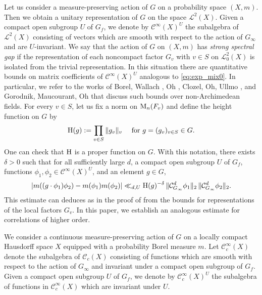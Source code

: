 \documentclass[11pt,reqno,a4paper]{amsart}
\numberwithin{equation}{section}
\newcommand{\cC}{\mathcal{C}}
\newcommand{\cL}{\mathcal{L}}
\theoremstyle{theorem}
\theoremstyle{definition}
\begin{document}
Let us consider a measure-preserving action of $G$ on a probability space $(X,m)$.
Then we obtain a unitary representation of $G$ on the space $\cL^2(X)$.
Given a compact open subgroup $U$ of $G_f$, we denote by $\cC^\infty(X)^U$
the subalgebra of $\cL^2(X)$ consisting of vectors which are smooth with respect to
the action of $G_\infty$ and are $U$-invariant.
We say that the action of $G$ on $(X,m)$
has \emph{strong spectral gap} if the representation of each noncompact factor $G_v$ with $v\in S$
on $\cL^2_{0}(X)$ is isolated  from the trivial representation.
In this situation there are quantitative bounds on matrix coefficients of $\cC^\infty(X)^U$
analogous to \eqref{eq:exp_mix0}. In particular, we refer to the works 
of Borel, Wallach \cite{BW}, Oh \cite{oh2}, Clozel, Oh, Ullmo \cite{CUO},
and Gorodnik, Maucourant, Oh \cite{GMO}
that discuss such bounds over non-Archimedean fields.
For every $v\in S$, let us fix a norm on $\hbox{M}_n(F_v)$ and define the height function on $G$ by
$$
\hbox{H}(g):=\prod_{v\in S} \|g_v\|_v\quad \hbox{ for $g=(g_v)_{v\in S}\in G$.} 
$$
One can check that $\hbox{H}$ is a proper function on $G$.
With this notation, there exists $\delta>0$
such that for all sufficiently large $d$, a compact open subgroup $U$ of $G_f$, 
functions $\phi_1,\phi_2\in \cC^\infty(X)^U$, and an element $g\in G$,
\begin{equation}
\label{eq:mixH}
|m((g\cdot \phi_1)\phi_2) -m(\phi_1)m(\phi_2)|\ll_{d,U} \hbox{H}(g)^{-\delta}\, \|\mathcal{C}_{G_\infty}^d\phi_1\|_2\, \|\mathcal{C}_{G_\infty}^d\phi_2\|_2.
\end{equation}
This estimate can deduces as in the proof of \cite[Theorem~3.27]{GMO} from the bounds 
for representations of the local factors $G_v$. In this paper, we establish an analogous estimate for correlations
of higher order.

We consider a continuous measure-preserving action of $G$ on a locally compact Hausdorff space $X$
equipped with a probability Borel measure $m$. Let $\cC_c^\infty(X)$ 
denote the subalgebra of $\cC_c(X)$ consisting of functions which are smooth with
respect to the action of $G_\infty$ and invariant under a compact open subgroup of $G_f$.
Given a compact open subgroup $U$ of $G_f$, we denote by $\cC_c^\infty(X)^U$
the subalgebra of functions in $\cC_c^\infty(X)$ which are invariant under $U$.
\end{document}
